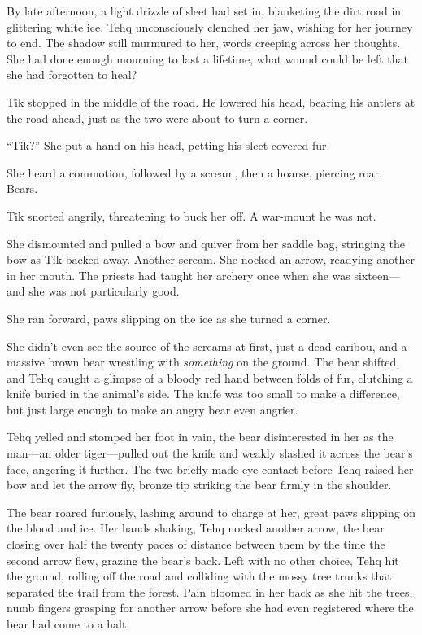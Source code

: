 By late afternoon, a light drizzle of sleet had set in, blanketing the dirt road in glittering white ice. Tehq unconsciously clenched her jaw, wishing for her journey to end. The shadow still murmured to her, words creeping across her thoughts. She had done enough mourning to last a lifetime, what wound could be left that she had forgotten to heal?

Tik stopped in the middle of the road. He lowered his head, bearing his antlers at the road ahead, just as the two were about to turn a corner.

``Tik?'' She put a hand on his head, petting his sleet-covered fur.

She heard a commotion, followed by a scream, then a hoarse, piercing roar. Bears.

Tik snorted angrily, threatening to buck her off. A war-mount he was not.

She dismounted and pulled a bow and quiver from her saddle bag, stringing the bow as Tik backed away. Another scream. She nocked an arrow, readying another in her mouth. The priests had taught her archery once when she was sixteen---and she was not particularly good.

She ran forward, paws slipping on the ice as she turned a corner.

She didn't even see the source of the screams at first, just a dead caribou, and a massive brown bear wrestling with \emph{something} on the ground. The bear shifted, and Tehq caught a glimpse of a bloody red hand between folds of fur, clutching a knife buried in the animal's side. The knife was too small to make a difference, but just large enough to make an angry bear even angrier.

Tehq yelled and stomped her foot in vain, the bear disinterested in her as the man---an older tiger---pulled out the knife and weakly slashed it across the bear's face, angering it further. The two briefly made eye contact before Tehq raised her bow and let the arrow fly, bronze tip striking the bear firmly in the shoulder.

The bear roared furiously, lashing around to charge at her, great paws slipping on the blood and ice. Her hands shaking, Tehq nocked another arrow, the bear closing over half the twenty paces of distance between them by the time the second arrow flew, grazing the bear's back. Left with no other choice, Tehq hit the ground, rolling off the road and colliding with the mossy tree trunks that separated the trail from the forest. Pain bloomed in her back as she hit the trees, numb fingers grasping for another arrow before she had even registered where the bear had come to a halt.

